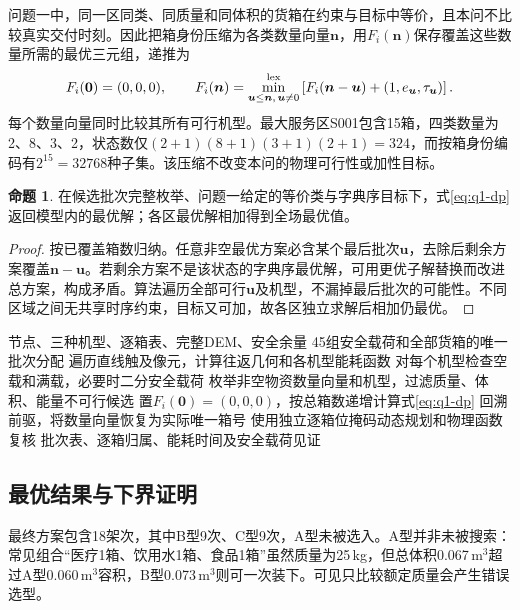 \documentclass[a4paper]{my_paper}%
\numberwithin{equation}{section}
\theoremstyle{definition}
\newtheorem{proposition}{命题}[section]
\newcommand{\QOneSorties}{18}
\begin{document}
问题一中，同一区同类、同质量和同体积的货箱在约束与目标中等价，且本问不比较真实交付时刻。因此把箱身份压缩为各类数量向量$\boldsymbol n$，用$F_i(\boldsymbol n)$保存覆盖这些数量所需的最优三元组，递推为
\begin{equation}
 F_i(\boldsymbol0)=(0,0,0),\qquad
 F_i(\boldsymbol n)=\min_{\boldsymbol u\le\boldsymbol n,\,\boldsymbol u\ne0}^{\rm lex}
 \left[F_i(\boldsymbol n-\boldsymbol u)+(1,e_{\boldsymbol u},\tau_{\boldsymbol u})\right].
 \label{eq:q1-dp}
\end{equation}
每个数量向量同时比较其所有可行机型。最大服务区S001包含15箱，四类数量为2、8、3、2，状态数仅$(2+1)(8+1)(3+1)(2+1)=324$，而按箱身份编码有$2^{15}=32768$种子集。该压缩不改变本问的物理可行性或加性目标。

\begin{proposition}
在候选批次完整枚举、问题一给定的等价类与字典序目标下，式\eqref{eq:q1-dp}返回模型内的最优解；各区最优解相加得到全场最优值。
\end{proposition}
\begin{proof}
按已覆盖箱数归纳。任意非空最优方案必含某个最后批次$\boldsymbol u$，去除后剩余方案覆盖$\boldsymbol n-\boldsymbol u$。若剩余方案不是该状态的字典序最优解，可用更优子解替换而改进总方案，构成矛盾。算法遍历全部可行$\boldsymbol u$及机型，不漏掉最后批次的可能性。不同区域之间无共享时序约束，目标又可加，故各区独立求解后相加仍最优。
\end{proof}

\begin{algorithm}[htbp]
\caption{单点安全能力与精确整箱组批}\label{alg:q1}
\begin{algorithmic}[1]
\Require 节点、三种机型、逐箱表、完整DEM、安全余量
\Ensure 45组安全载荷和全部货箱的唯一批次分配
 \State 遍历直线触及像元，计算往返几何和各机型能耗函数
 \State 对每个机型检查空载和满载，必要时二分安全载荷
 \State 枚举非空物资数量向量和机型，过滤质量、体积、能量不可行候选
 \State 置$F_i(\boldsymbol0)=(0,0,0)$，按总箱数递增计算式\eqref{eq:q1-dp}
 \State 回溯前驱，将数量向量恢复为实际唯一箱号
\EndFor
\State 使用独立逐箱位掩码动态规划和物理函数复核
\State \Return 批次表、逐箱归属、能耗时间及安全载荷见证
\end{algorithmic}
\end{algorithm}

\subsection{最优结果与下界证明}
最终方案包含\QOneSorties 架次，其中B型9次、C型9次，A型未被选入。A型并非未被搜索：常见组合“医疗1箱、饮用水1箱、食品1箱”虽然质量为25\,kg，但总体积0.067\,m$^3$超过A型0.060\,m$^3$容积，B型0.073\,m$^3$则可一次装下。可见只比较额定质量会产生错误选型。
\end{document}
